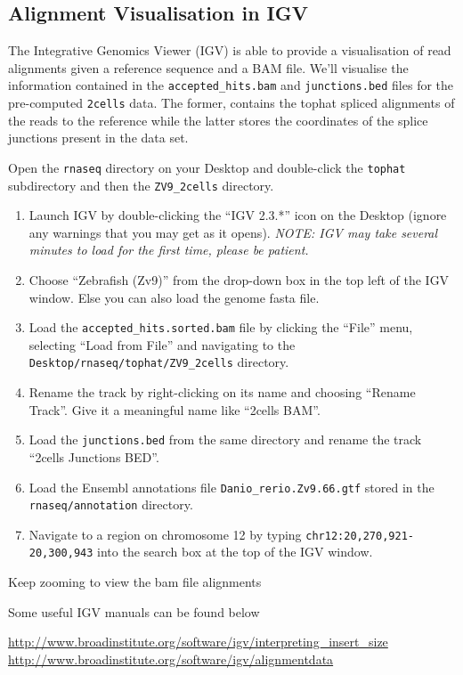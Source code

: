 \subsection{Alignment Visualisation in IGV}

The Integrative Genomics Viewer (IGV) is able to provide a visualisation of read
alignments given a reference sequence and a BAM file. We'll visualise the
information contained in the \texttt{accepted\_hits.bam} and
\texttt{junctions.bed} files for the pre-computed \texttt{2cells} data. The
former, contains the tophat spliced alignments of the reads to the reference
while the latter stores the coordinates of the splice junctions present in the
data set.

\begin{steps}
Open the \texttt{rnaseq} directory on your Desktop and double-click the
\texttt{tophat} subdirectory and then the \texttt{ZV9\_2cells} directory.

\begin{enumerate}
  \item Launch IGV by double-clicking the ``IGV 2.3.*'' icon on the Desktop
  (ignore any warnings that you may get as it opens). \emph{NOTE: IGV may take
  several minutes to load for the first time, please be patient.}
  \item Choose ``Zebrafish (Zv9)'' from the drop-down box in the top left of the
  IGV window. Else you can also load the genome fasta file.
  \item Load the \texttt{accepted\_hits.sorted.bam} file by clicking the
  ``File'' menu, selecting ``Load from File'' and navigating to the
  \texttt{Desktop/rnaseq/tophat/ZV9\_2cells} directory.
  \item Rename the track by right-clicking on its name and choosing ``Rename
  Track''. Give it a meaningful name like ``2cells BAM''.
  \item Load the \texttt{junctions.bed} from the same directory and rename the
  track ``2cells Junctions BED''.
  \item Load the Ensembl annotations file \texttt{Danio\_rerio.Zv9.66.gtf}
  stored in the \texttt{rnaseq/annotation} directory.
  \item Navigate to a region on chromosome 12 by typing
  \texttt{chr12:20,270,921-20,300,943} into the search box at the top of the IGV
  window.
\end{enumerate}

\end{steps}

\begin{information}
Keep zooming to view the bam file alignments

Some useful IGV manuals can be found below

\url{http://www.broadinstitute.org/software/igv/interpreting_insert_size}\\
\url{http://www.broadinstitute.org/software/igv/alignmentdata}
\end{information}

